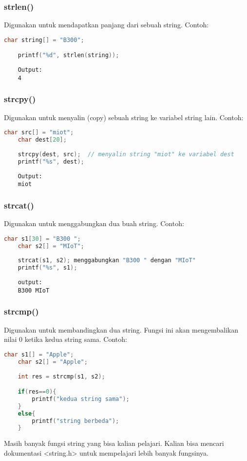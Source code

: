 \subsubsection{strlen()}
Digunakan untuk mendapatkan panjang dari sebuah string.
Contoh:
\begin{lstlisting}[language=c]
	char string[] = "B300";

	printf("%d", strlen(string));
\end{lstlisting}
\begin{verbatim}
	Output:
	4
\end{verbatim}

\subsubsection{strcpy()}
Digunakan untuk menyalin (copy) sebuah string ke variabel string lain.
Contoh:
\begin{lstlisting}[language=c]
	char src[] = "miot";
	char dest[20];
	
	strcpy(dest, src);  // menyalin string "miot" ke variabel dest
	printf("%s", dest);
\end{lstlisting}
\begin{verbatim}
	Output:
	miot
\end{verbatim}

\subsubsection{strcat()}
Digunakan untuk menggabungkan dua buah string.
Contoh:
\begin{lstlisting}[language=c]
	char s1[30] = "B300 ";
	char s2[] = "MIoT";
	
	strcat(s1, s2); menggabungkan "B300 " dengan "MIoT"
	printf("%s", s1);
\end{lstlisting}
\begin{verbatim}
	output:
	B300 MIoT	
\end{verbatim}

\subsubsection{strcmp()}
Digunakan untuk membandingkan dua string.
Fungsi ini akan mengembalikan nilai 0 ketika kedua string sama.
Contoh:
\begin{lstlisting}[language=c]
	char s1[] = "Apple";
	char s2[] = "Apple";
	
	int res = strcmp(s1, s2);

	if(res==0){
		printf("kedua string sama");
	}
	else{
		printf("string berbeda");
	}
\end{lstlisting}
Masih banyak fungsi string yang bisa kalian pelajari.
Kalian bisa mencari dokumentasi <string.h> untuk mempelajari lebih banyak fungsinya.


